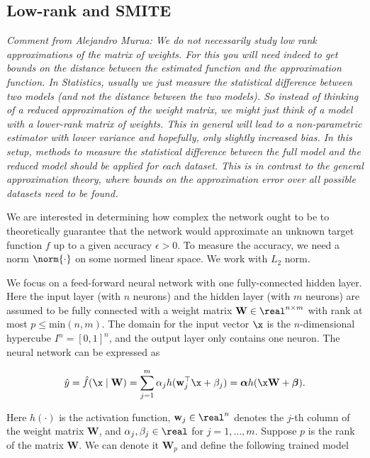 \subsection{Low-rank and SMITE}

\textit{Comment from Alejandro Murua: We do not necessarily study low rank approximations of the matrix of weights. For this you will need indeed to get bounds on the distance between the estimated function and the approximation function. In Statistics, usually we just measure the statistical difference between two models (and not the distance between the two models). So instead of thinking of a reduced approximation of the weight matrix, we might just think of a model with a lower-rank matrix of weights. This in general will lead to a non-parametric estimator with lower variance and hopefully, only slightly increased bias. In this setup, methods to measure the statistical difference between the full model and the reduced model should be applied for each dataset. This is in contrast to the general approximation theory, where bounds on the approximation error over all possible datasets need to be found.}


We are interested in determining how complex the network ought to be to theoretically guarantee that the network would approximate an unknown target function $f$ up to a given accuracy $\epsilon > 0$. To measure the accuracy, we need a norm $\norm{\cdot}$ on some normed linear space. We work with $L_2$ norm.

We focus on a feed-forward neural network with one fully-connected hidden layer. Here the input layer (with $n$ neurons) and the hidden layer (with $m$ neurons) are assumed to be fully connected with a weight matrix $\mathbf W \in \real^{n \times m}$ with rank at most $p \leq \mathrm{min}(n,m)$. The domain for the input vector $\x$ is the $n$-dimensional hypercube $I^n = [0, 1]^n$, and the output layer only contains one neuron. The neural network can be expressed as 

$$\hat y = \hat f(\x\mid \mathbf  W) = \sum_{j=1}^m \alpha_j h(\mathbf w_j^\top\x + \beta_j) = \boldsymbol{\alpha} h(\x \mathbf{W} + \boldsymbol{\beta}).$$ 

Here $h(\cdot)$ is the activation function, $\mathbf w_j \in \real^n$ denotes the $j$-th column of the weight matrix $\mathbf W$, and $\alpha_j, \beta_j \in \real$ for $j = 1, \ldots, m$. Suppose $p$ is the rank of the matrix $\mathbf W$. We can denote it $\mathbf W_p$ and define the following trained model

